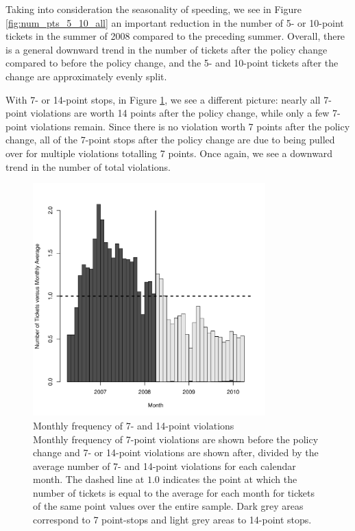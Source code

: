 Taking into consideration the seasonality of speeding, we see 
in Figure \ref{fig:num_pts_5_10_all}
an important reduction in the number of 5- or 10-point tickets 
in the summer of 2008 compared to the preceding summer. 
Overall, there is a general downward trend in the number of tickets 
after the policy change compared to before the policy change, 
and the 5- and 10-point tickets after the change are approximately evenly split. 

With 7- or 14-point stops,
in Figure \ref{fig:num_pts_7_14_all}, 
we see a different picture: 
nearly all 7-point violations are worth 14 points after the policy change, 
while only a few 7-point violations remain. 
Since there is no violation worth 7 points after the policy change, 
all of the 7-point stops after the policy change are due to being pulled over 
for multiple violations totalling 7 points. 
Once again, we see a downward trend in the number of total violations. 


\begin{figure}
\centering
\includegraphics[width=0.8\textwidth]{Figures/num_pts_7_14_all}
\caption{Monthly frequency of 7- and 14-point violations \\
Monthly frequency of 7-point violations are shown before the policy change 
and 7- or 14-point violations are shown after, 
divided by the average number of 7- and 14-point violations
for each calendar month. 
% 
The dashed line at $1.0$ indicates the point at which 
the number of tickets is equal to the average for each month 
for tickets of the same point values over the entire sample.
% 
Dark grey areas correspond to 7 point-stops and light grey areas to 14-point stops.
}\label{fig:num_pts_7_14_all}
\end{figure}


